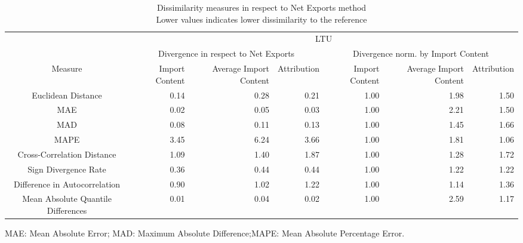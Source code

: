 \begin{table}[t]
\caption*{
{\large Dissimilarity measures in respect to Net Exports method} \\ 
{\small Lower values indicates lower dissimilarity to the reference}
} 
\fontsize{15.0pt}{18.0pt}\selectfont
\begin{tabular*}{\linewidth}{@{\extracolsep{\fill}}crrrrrr}
\toprule
 & \multicolumn{6}{c}{LTU} \\ 
\cmidrule(lr){2-7}
 & \multicolumn{3}{c}{Divergence in respect to Net Exports} & \multicolumn{3}{c}{Divergence norm. by Import Content} \\ 
\cmidrule(lr){2-4} \cmidrule(lr){5-7}
Measure & Import Content & Average Import Content & Attribution & Import Content & Average Import Content & Attribution \\ 
\midrule\addlinespace[2.5pt]
Euclidean Distance & 0.14 & 0.28 & 0.21 & 1.00 & 1.98 & 1.50 \\ 
MAE & 0.02 & 0.05 & 0.03 & 1.00 & 2.21 & 1.50 \\ 
MAD & 0.08 & 0.11 & 0.13 & 1.00 & 1.45 & 1.66 \\ 
MAPE & 3.45 & 6.24 & 3.66 & 1.00 & 1.81 & 1.06 \\ 
Cross-Correlation Distance & 1.09 & 1.40 & 1.87 & 1.00 & 1.28 & 1.72 \\ 
Sign Divergence Rate & 0.36 & 0.44 & 0.44 & 1.00 & 1.22 & 1.22 \\ 
Difference in Autocorrelation & 0.90 & 1.02 & 1.22 & 1.00 & 1.14 & 1.36 \\ 
Mean Absolute Quantile Differences & 0.01 & 0.04 & 0.02 & 1.00 & 2.59 & 1.17 \\ 
\bottomrule
\end{tabular*}
\begin{minipage}{\linewidth}
MAE: Mean Absolute Error; MAD: Maximum Absolute Difference;MAPE: Mean Absolute Percentage Error.\\
\end{minipage}
\end{table}

